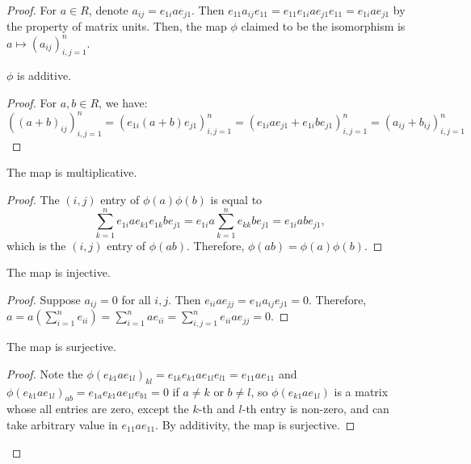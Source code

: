   \begin{proof}
    For $a \in R$, denote $a_{ij} = e_{1i}ae_{j1}$. Then $e_{11}a_{ij}e_{11} = e_{11}e_{1i}ae_{j1}e_{11} = e_{1i}ae_{j1}$ by the property of matrix units. Then, the map $\phi$ claimed to be the isomorphism is $a \mapsto (a_{ij})_{i,j=1}^n$.
    \begin{claim}
      $\phi$ is additive.
    \end{claim}
    \begin{proof}
      For $a, b \in R$, we have:
      $((a + b)_{ij})_{i,j=1}^n = (e_{1i}(a + b)e_{j1})_{i,j=1}^n = (e_{1i}ae_{j1} + e_{1i}be_{j1})_{i,j=1}^n = (a_{ij} + b_{ij})_{i,j=1}^n$
    \end{proof}
    \begin{claim}
      The map is multiplicative.
    \end{claim}
    \begin{proof}
      The $(i,j)$ entry of $\phi(a)\phi(b)$ is equal to 
      $$
        \sum_{k=1}^n e_{1i}ae_{k1}e_{1k}be_{j1} = e_{1i}a \sum_{k=1}^n e_{kk} be_{j1} = e_{1i}abe_{j1},
      $$
      which is the $(i,j)$ entry of $\phi(ab)$. Therefore, $\phi(ab) = \phi(a)\phi(b)$.
    \end{proof}
    \begin{claim}
      The map is injective.
    \end{claim}
    \begin{proof}
      Suppose $a_{ij} = 0$ for all $i, j$. Then $e_{ii}ae_{jj} = e_{1i}a_{ij}e_{j1} = 0$. Therefore, $a = a(\sum_{i=1}^n e_{ii}) = \sum_{i=1}^n ae_{ii} = \sum_{i,j=1}^n e_{ii}ae_{jj} = 0$.
    \end{proof}
    \begin{claim}
      The map is surjective.
    \end{claim}
    \begin{proof}
      Note the $\phi(e_{k1}ae_{1l})_{kl} = e_{1k}e_{k1}a e_{1l}e_{l1} = e_{11}ae_{11}$ and $\phi(e_{k1}ae_{1l})_{ab} = e_{1a}e_{k1}a e_{1l}e_{b1} = 0$ if $a \neq k$ or $b \neq l$, so $\phi(e_{k1}ae_{1l})$ is a matrix whose all entries are zero, except the $k$-th and $l$-th entry is non-zero, and can take arbitrary value in $e_{11}ae_{11}$. By additivity, the map is surjective.
    \end{proof}

  \end{proof}

